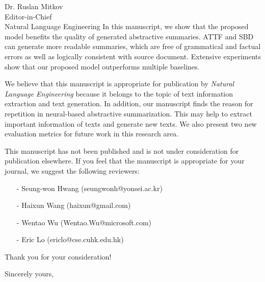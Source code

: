 \documentclass[11pt]{letter} %
\begin{document}
\begin{letter}{Dr. Ruslan Mitkov \\
Editor-in-Chief  \\
Natural Language Engineering}
In this manuscript, we show that the proposed model benefits the quality of generated abstractive summaries.
ATTF and SBD can generate more readable summaries, which are free of grammatical and factual errors
as well as logically consistent with source document.
Extensive experiments show that our proposed model outperforms multiple baselines.
 
We believe that this manuscript is appropriate for publication by
\textit{Natural Language Engineering}
because it belongs to the topic of text information extraction and text generation. 
In addition, our manuscript finds the reason for repetition in neural-based abstractive summarization.
This may help to extract important information of texts and generate new texts.
We also present two new evaluation metrics for future work in this research area.

This manuscript has not been published and is not under
consideration for publication elsewhere. 
If you feel that the manuscript is appropriate for your journal, 
we suggest the following reviewers: 
\begin{enumerate}
	\item[-] Seung-won Hwang (seungwonh@yonsei.ac.kr)
	\item[-] Haixun Wang (haixun@gmail.com)
	\item[-] Wentao Wu (Wentao.Wu@microsoft.com)
	\item[-] Eric Lo (ericlo@cse.cuhk.edu.hk)
\end{enumerate}
Thank you for your consideration!

\closing{Sincerely yours,}




\end{letter}
\end{document}
